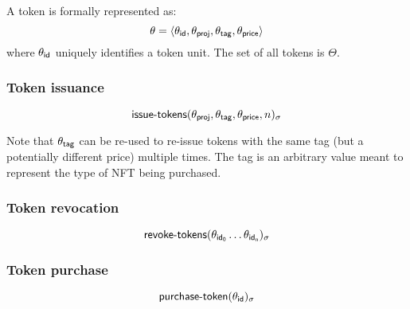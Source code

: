 A token is formally represented as:
\[
    \theta = \langle\theta_{\mathsf{id}}, \theta_{\mathsf{proj}}, \theta_{\mathsf{tag}},
                    \theta_{\mathsf{price}}\rangle
\]
where $\theta_{\mathsf{id}}$ uniquely identifies a token unit. The set of
all tokens is $\Theta$.

\subsubsection{Token issuance}
\[
    \operatorname{\mathsf{issue-tokens}}\lparen\theta_{\mathsf{proj}}, \theta_{\mathsf{tag}}, \theta_{\mathsf{price}}, n\rparen_\sigma
\]

Note that $\theta_{\mathsf{tag}}$ can be re-used to re-issue tokens with the same tag (but a potentially different price) multiple times. The tag is an arbitrary value meant to represent
the type of NFT being purchased.

\subsubsection{Token revocation}
\[
    \operatorname{\mathsf{revoke-tokens}}\lparen\theta_{\mathsf{id_0}} \ldots \theta_{\mathsf{id_n}}\rparen_\sigma
\]

\subsubsection{Token purchase}
\[
    \operatorname{\mathsf{purchase-token}}\lparen\theta_{\mathsf{id}}\rparen_\sigma
\]

